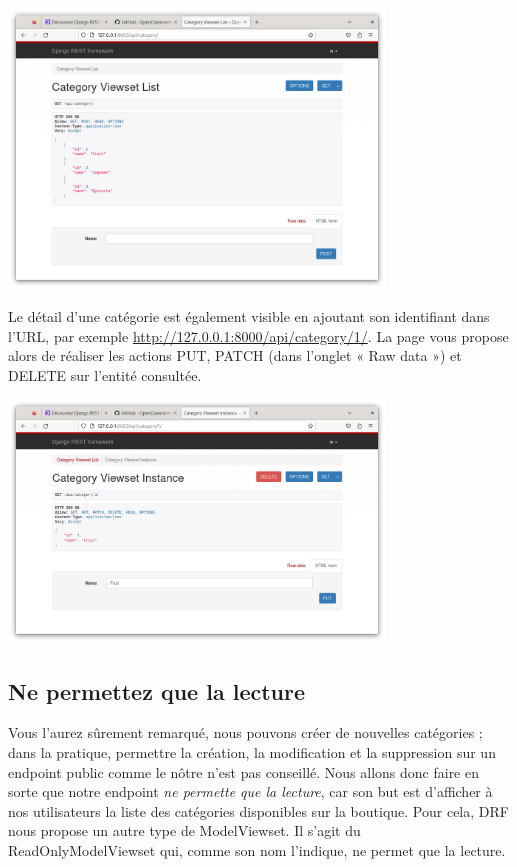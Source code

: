 \documentclass[a4paper]{article}
\begin{document}
\begin{center}
\includegraphics[width=10cm]{images/image06.png}
\end{center}
Le détail d’une catégorie est également visible en ajoutant son identifiant dans l’URL, par exemple \url{http://127.0.0.1:8000/api/category/1/}. La page vous propose alors de réaliser les actions {\color{monOrange}PUT, PATCH} (dans l’onglet « Raw data ») et {\color{monOrange}DELETE} sur l’entité consultée.
\begin{center}
\includegraphics[width=10cm]{images/image07.png}
\end{center}
\subsection{Ne permettez que la lecture}
Vous l’aurez sûrement remarqué, nous pouvons créer de nouvelles catégories ; dans la pratique, permettre la création, la modification et la suppression sur un endpoint public comme le nôtre n’est pas conseillé. Nous allons donc faire en sorte que notre endpoint {\em ne permette que la lecture}, car son but est d’afficher à nos utilisateurs la liste des catégories disponibles sur la boutique. Pour cela, DRF nous propose un autre type de {\color{monOrange}ModelViewset}. Il s’agit du {\color{monOrange}ReadOnlyModelViewset}  qui, comme son nom l’indique, ne permet que la lecture.
\end{document}
